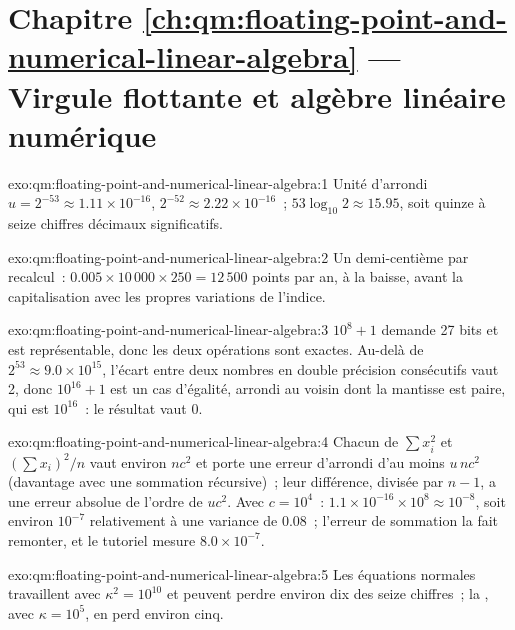 \section*{Chapitre \ref{ch:qm:floating-point-and-numerical-linear-algebra} --- Virgule flottante et algèbre linéaire numérique}

\begin{solution}{exo:qm:floating-point-and-numerical-linear-algebra:1}
Unité d'arrondi $u = 2^{-53} \approx 1.11 \times 10^{-16}$,  $2^{-52} \approx 2.22 \times 10^{-16}$~; $53\log_{10}2 \approx 15.95$, soit quinze à seize chiffres décimaux significatifs.
\end{solution}

\begin{solution}{exo:qm:floating-point-and-numerical-linear-algebra:2}
Un demi-centième par recalcul~: $0.005 \times 10\,000 \times 250 = 12\,500$ points par an, à la baisse, avant la capitalisation avec les propres variations de l'indice.
\end{solution}

\begin{solution}{exo:qm:floating-point-and-numerical-linear-algebra:3}
$10^8 + 1$ demande 27 bits et est représentable, donc les deux opérations sont exactes. Au-delà de $2^{53} \approx 9.0 \times 10^{15}$, l'écart entre deux nombres en double précision consécutifs vaut 2, donc $10^{16} + 1$ est un cas d'égalité, arrondi au
voisin dont la mantisse est paire, qui est $10^{16}$~: le résultat vaut 0.
\end{solution}

\begin{solution}{exo:qm:floating-point-and-numerical-linear-algebra:4}
Chacun de $\sum x_i^2$ et $(\sum x_i)^2/n$ vaut environ $nc^2$ et porte une erreur d'arrondi d'au moins $u\,nc^2$ (davantage avec une sommation récursive)~; leur différence, divisée par $n - 1$, a une erreur absolue
de l'ordre de $uc^2$. Avec $c = 10^4$~: $1.1 \times 10^{-16} \times 10^8 \approx 10^{-8}$, soit environ $10^{-7}$ relativement à une variance de 0.08~; l'erreur de sommation la fait remonter, et le tutoriel
mesure $8.0 \times 10^{-7}$.
\end{solution}

\begin{solution}{exo:qm:floating-point-and-numerical-linear-algebra:5}
Les équations normales travaillent avec $\kappa^2 = 10^{10}$ et peuvent perdre environ dix des seize chiffres~; la , avec $\kappa = 10^5$, en perd environ cinq.
\end{solution}

